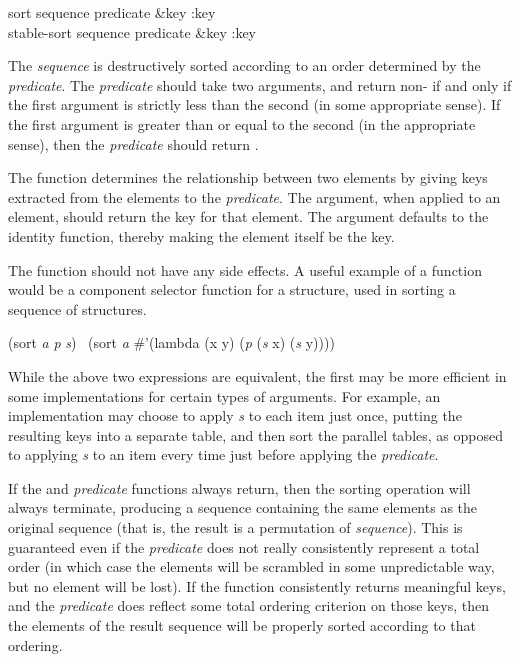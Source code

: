 \begin{defun}[Function]
sort sequence predicate &key :key \\
stable-sort sequence predicate &key :key

The {\it sequence} is destructively sorted according to an order determined by
the {\it predicate}.  The {\it predicate} should take two
arguments, and return non-{\false} if and only if the first argument is
strictly less than the second (in some appropriate sense). 
If the first argument is greater than or equal to the second
(in the appropriate sense), then the {\it predicate} should return {\false}.

The  function determines the relationship between two elements
by giving keys extracted from the elements to the {\it predicate}.
The  argument, when applied to an element, should return
the key for that element.  The  argument defaults to the identity
function, thereby making the element itself be the key.

The  function should not have any side effects.
A useful example of a  function would be a component
selector function for a  structure, used in sorting
a sequence of structures.
\begin{lisp}
(sort {\it a} {\it p}  {\it s})
   \EQ\ (sort {\it a} \#'(lambda (x y) ({\it p} ({\it s} x) ({\it s} y))))
\end{lisp}
While the above two expressions are equivalent, the first may be more
efficient in some implementations for certain types of arguments.  For
example, an implementation may choose to apply {\it s} to each
item just once, putting the resulting keys into a separate table, and
then sort the parallel tables, as opposed to applying
{\it s} to an item every time just before applying the {\it predicate}.

If the  and {\it predicate} functions always return, then the
sorting operation will always terminate, producing a sequence containing
the same elements as the original sequence (that is, the result is a
permutation of {\it sequence}).  This is guaranteed even if the
{\it predicate} does not really consistently represent a total order
(in which case the elements will be scrambled in some unpredictable
way, but no element will be lost).  If
the  function consistently returns meaningful keys,
and the {\it predicate}
does reflect some total ordering criterion on those keys, then the
elements of the result sequence will be properly sorted according
to that ordering.


\end{defun}

